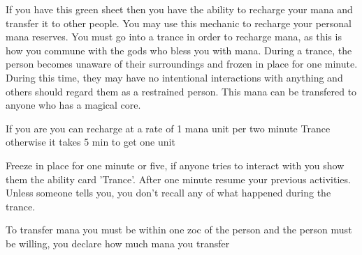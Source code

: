 \documentclass[green]{guildcamp3}
\begin{document}
	
	\name{\gManaRecharge{}}
	
	
	
	
	
	If you have this green sheet then you have the ability to recharge your mana and transfer it to other people.
	You may use this mechanic to recharge your personal mana reserves. You must go into a trance in order to recharge mana, as this is how you commune with the gods who bless you with mana. 	During a trance, the person becomes unaware of their surroundings and frozen in place for one minute. During this time, they may have no intentional interactions with anything and others should regard them as a restrained person. This mana can be transfered to anyone who has a magical core. 
	
	
	
	
	\begin{enum}[Directions]
		\item If you are \cPaladin{} you can recharge at a rate of 1 mana unit per two minute Trance otherwise it takes 5 min to get one unit 
		\item Freeze in place for one minute or five, if anyone tries to interact with you show them the ability card 'Trance'. After one minute resume your previous activities. Unless someone tells you, you don't recall any of what happened during the trance.
		\item To transfer mana you must be within one zoc of the person and the person must be willing, you declare how much mana you transfer
	\end{enum}
	
\end{document}
